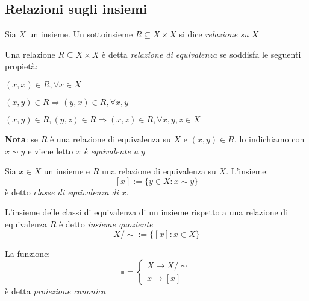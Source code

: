         \subsection{Relazioni sugli insiemi}
            \begin{definition}
                Sia $X$ un insieme. Un sottoinsieme $R \subseteq X \times X$ si dice \emph{relazione su $X$}
            \end{definition}
            \begin{definition}
                Una relazione $R \subseteq X \times X$ è detta \emph{relazione di equivalenza} se soddisfa le seguenti propietà:
            \end{definition}
            \begin{propertyOfDefinition}[Riflessività]
                $(x,x) \in R, \forall x \in X$
            \end{propertyOfDefinition}
            \begin{propertyOfDefinition}[Simmetria]
                $(x,y) \in R \Rightarrow (y,x) \in R, \forall x,y$
            \end{propertyOfDefinition}
            \begin{propertyOfDefinition}[Transività]
                $(x,y) \in R, (y,z) \in R \Rightarrow (x,z) \in R, \forall x,y,z \in X$
            \end{propertyOfDefinition}
            \textbf{Nota}: se $R$ è una relazione di equivalenza su $X$ e $(x,y) \in R$, lo indichiamo con $x \sim y$ e viene letto \emph{$x$ è equivalente a $y$}
            \begin{definition}
                Sia $x \in X$ un insieme e $R$ una relazione di equivalenza su $X$. L'insieme: $$[x] := \{y \in X : x \sim y\}$$ è detto \emph{classe di equivalenza di $x$}.
            \end{definition}
            \begin{definition}
                L'insieme delle classi di equivalenza di un insieme rispetto a una relazione di equivalenza $R$ è detto \emph{insieme quoziente}
                $$X/\sim := \{[x]: x \in X\}$$
            \end{definition}
            \begin{definition}
                La funzione:
                $$\mathbb{\pi} =
                \begin{cases}
                    X \rightarrow X/\sim\\
                    x \rightarrow [x]
                \end{cases}$$
                è detta \emph{proiezione canonica}
            \end{definition}
